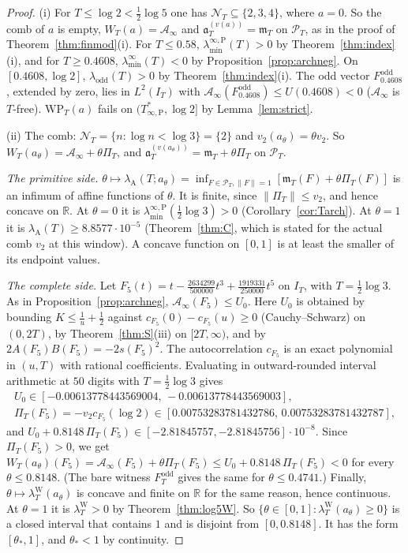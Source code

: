 \documentclass[11pt]{amsart}
\theoremstyle{definition}
\theoremstyle{remark}
\newcommand{\R}{\mathbb R}
\newcommand{\PT}{\mathcal P_T}
\newcommand{\IT}{I_T}
\newcommand{\lamW}{\lambda^{\mathrm W}_T}
\newcommand{\lamA}{\lambda_{\mathrm A}(T)}
\newcommand{\NT}{\mathcal N_T}
\newcommand{\Ainf}{\mathcal A_\infty}
\newcommand{\PiT}{\Pi_T}
\newcommand{\mT}{\mathfrak m_T}
\newcommand{\laminf}{\lambda^{\infty}_{\min}}
\newcommand{\laminfP}{\lambda^{\infty,\mathrm P}_{\min}}
\begin{document}
\begin{proof}
(i) For $T\le\log2<\frac12\log5$ one has $\NT\subseteq\{2,3,4\}$, where $a=0$. So the comb of $a$ is empty,
$W_T(a)=\Ainf$ and $\mathfrak a^{(v(a))}_T=\mT$ on $\PT$, as in the proof of Theorem~\ref{thm:finmod}(i). For
$T\le0.58$, $\laminfP(T)>0$ by Theorem~\ref{thm:index}(i), and for $T\ge0.4608$, $\laminf(T)<0$ by
Proposition~\ref{prop:archneg}. On $[0.4608,\log2]$, $\lambda_{\mathrm{odd}}(T)>0$ by Theorem~\ref{thm:index}(i). The
odd vector $F^{\mathrm{odd}}_{0.4608}$, extended by zero, lies in $L^2(\IT)$ with
$\Ainf(F^{\mathrm{odd}}_{0.4608})\le U(0.4608)<0$ ($\Ainf$ is $T$-free). $\mathrm{WP}_T(a)$ fails on
$(T^*_{\infty,\mathrm P},\log2]$ by Lemma~\ref{lem:strict}.

(ii) The comb: $\NT=\{n:\log n<\log3\}=\{2\}$ and $v_2(a_\theta)=\theta v_2$. So
$W_T(a_\theta)=\Ainf+\theta\PiT$, and $\mathfrak a^{(v(a_\theta))}_T=\mT+\theta\PiT$ on $\PT$.

\emph{The primitive side.} $\theta\mapsto\lambda_{\mathrm A}(T;a_\theta)=\inf_{F\in\PT,\|F\|=1}[\mT(F)+\theta\PiT(F)]$
is an infimum of affine functions of $\theta$. It is finite, since $\|\PiT\|\le v_2$, and hence concave on
$\R$. At $\theta=0$ it is $\laminfP(\frac12\log3)>0$ (Corollary~\ref{cor:Tarch}). At $\theta=1$ it is
$\lamA\ge8.8577\cdot10^{-5}$ (Theorem~\ref{thm:C}, which is stated for the actual comb $v_2$ at this window). A
concave function on $[0,1]$ is at least the smaller of its endpoint values.

\emph{The complete side.} Let
$F_5(t)=t-\frac{2634299}{500000}t^3+\frac{1919331}{250000}t^5$ on $\IT$, with $T=\frac12\log3$. As in
Proposition~\ref{prop:archneg}, $\Ainf(F_5)\le U_0$. Here $U_0$ is obtained by bounding $K\le\frac1u+\frac12$
against $c_{F_5}(0)-c_{F_5}(u)\ge0$ (Cauchy--Schwarz) on $(0,2T)$, by Theorem~\ref{thm:S}(iii) on $[2T,\infty)$,
and by $2A(F_5)B(F_5)=-2s(F_5)^2$. The autocorrelation $c_{F_5}$ is an exact polynomial in $(u,T)$ with rational
coefficients. Evaluating in outward-rounded interval arithmetic at $50$ digits with $T=\frac12\log3$ gives
\begin{gather*}
U_0\in[-0.00613778443569004,\,-0.00613778443569003],\\
\PiT(F_5)=-v_2c_{F_5}(\log2)\in[0.00753283781432786,\,0.00753283781432787],
\end{gather*}
and $U_0+0.8148\,\PiT(F_5)\in[-2.81845757,-2.81845756]\cdot10^{-8}$. Since $\PiT(F_5)>0$, we get
$W_T(a_\theta)(F_5)=\Ainf(F_5)+\theta\PiT(F_5)\le U_0+0.8148\,\PiT(F_5)<0$ for every $\theta\le0.8148$. (The bare
witness $F^{\mathrm{odd}}_T$ gives the same for $\theta\le0.4741$.) Finally, $\theta\mapsto\lambda^{\mathrm W}_T(a_\theta)$
is concave and finite on $\R$ for the same reason, hence continuous. At $\theta=1$ it is
$\lamW>0$ by Theorem~\ref{thm:log5W}. So
$\{\theta\in[0,1]:\lambda^{\mathrm W}_T(a_\theta)\ge0\}$ is a closed interval that contains $1$ and is disjoint from
$[0,0.8148]$. It has the form $[\theta_*,1]$, and $\theta_*<1$ by continuity.


\end{proof}
\end{document}
